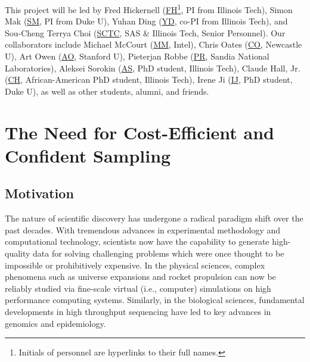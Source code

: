 \documentclass[11pt]{NSFamsart}
\newcommand{\cmtS}[1]{{\color{blue}{(Simon: #1)}}}
\newcommand{\FH}{\hyperlink{FHlink}{FH}\xspace}
\newcommand{\SM}{\hyperlink{SMlink}{SM}\xspace}
\newcommand{\SCTC}{\hyperlink{SCTClink}{SCTC}\xspace}
\newcommand{\AO}{\hyperlink{AOlink}{AO}\xspace}
\newcommand{\MM}{\hyperlink{MMlink}{MM}\xspace}
\newcommand{\CH}{\hyperlink{CHlink}{CH}\xspace}
\newcommand{\CO}{\hyperlink{COlink}{CO}\xspace}
\newcommand{\TS}{\hyperlink{TSlink}{TS}\xspace}
\newcommand{\IJi}{\hyperlink{IJlink}{IJ}\xspace}
\newcommand{\YD}{\hyperlink{YDlink}{YD}\xspace}
\newcommand{\AS}{\hyperlink{ASlink}{AS}\xspace}
\newcommand{\PR}{\hyperlink{PRlink}{PR}\xspace}
\newcommand{\DN}{\hyperlink{DNlink}{DN}\xspace}
\begin{document}
This project will be led by 
\hypertarget{FHlink}{Fred Hickernell} (\FH\footnote{Initials of personnel are hyperlinks to their full names.}, PI from Illinois Tech), 
\hypertarget{SMlink}{Simon Mak} (\SM, PI from Duke U), 
\hypertarget{YDlink}{Yuhan Ding} (\YD, co-PI from Illinois Tech), and 
\hypertarget{SCTClink}{Sou-Cheng Terrya Choi} (\SCTC, SAS \& Illinois Tech, Senior Personnel).  
Our collaborators include  
\hypertarget{MMlink}{Michael McCourt} (\MM, Intel), 
\hypertarget{COlink}{Chris Oates} (\CO, Newcastle U), 
\hypertarget{AOlink}{Art Owen} (\AO, Stanford U), 
\hypertarget{PRlink}{Pieterjan Robbe} (\PR, Sandia National Laboratories),  
\hypertarget{ASlink}{Aleksei Sorokin} (\AS, PhD student, Illinois Tech),
\hypertarget{CHlink}{Claude Hall, Jr.} (\CH, African-American PhD student, Illinois Tech),
\hypertarget{IJlink}{Irene Ji} (\IJi, PhD student, Duke U), as well as other students, alumni, and friends. \cmtS{to modify, put later?}




\section{The Need for Cost-Efficient and Confident Sampling}

\subsection{Motivation} The nature of scientific discovery has undergone a radical paradigm shift over the past decades. With tremendous advances in experimental methodology and computational technology, scientists now have the capability to generate high-quality data for solving challenging problems which were once thought to be impossible or prohibitively expensive. In the physical sciences, complex phenomena such as universe expansions \citep{kaufman2011efficient} and rocket propulsion \citep{mak2018efficient,yeh2018common} can now be reliably studied via fine-scale virtual (i.e., computer) simulations on high performance computing systems. Similarly, in the biological sciences, fundamental developments in high throughput sequencing have led to key advances in genomics and epidemiology.
\end{document}
